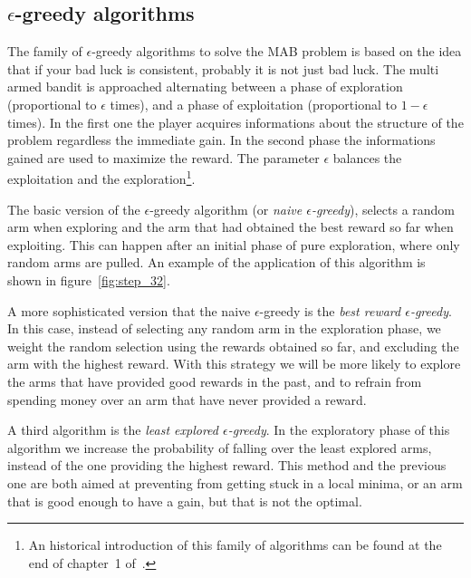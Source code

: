 \documentclass[]{scrartcl}
\theoremstyle{definition}
\begin{document}
\subsection*{$\epsilon$-greedy algorithms}

The family of $\epsilon$-greedy algorithms to solve the MAB problem is based on the idea that if your bad luck is consistent, probably it is not just bad luck. The multi armed bandit is approached alternating between a phase of exploration (proportional to $\epsilon$ times), and a phase of exploitation (proportional to $1 - \epsilon$ times). In the first one the player acquires informations about the structure of the problem regardless the immediate gain. In the second phase the informations gained are used to maximize the reward. The parameter $\epsilon$ balances the exploitation and the exploration\footnote{
    An historical introduction of this family of algorithms can be found at the end of chapter~1 of~\cite{sutton2018reinforcement}.
}.

The basic version of the $\epsilon$-greedy algorithm (or \emph{naive $\epsilon$-greedy}), selects a random arm when exploring and the arm that had obtained the best reward so far when exploiting. This can happen after an initial phase of pure exploration, where only random arms are pulled. An example of the application of this algorithm is shown in figure~\ref{fig:step_32}.

A more sophisticated version that the naive $\epsilon$-greedy is the \emph{best reward $\epsilon$-greedy}. In this case, instead of selecting any random arm in the exploration phase, we weight the random selection using the rewards obtained so far, and excluding the arm with the highest reward. With this strategy we will be more likely to explore the arms that have provided good rewards in the past, and to refrain from spending money over an arm that have never provided a reward.

A third algorithm is the \emph{least explored $\epsilon$-greedy}. In the exploratory phase of this algorithm we increase the probability of falling over the least explored arms, instead of the one providing the highest reward. This method and the previous one are both aimed at preventing from getting stuck in a local minima, or an arm that is good enough to have a gain, but that is not the optimal.
\end{document}
